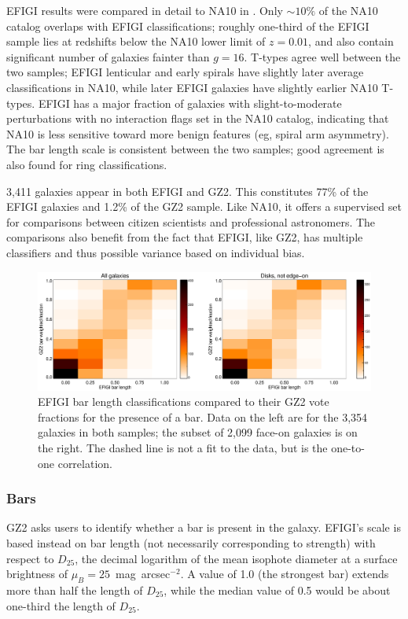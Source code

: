 \documentclass[useAMS,usenatbib]{mn2e}
\begin{document}
EFIGI results were compared in detail to NA10 in \citet{bai11}. Only $\sim10\%$ of the NA10 catalog overlaps with EFIGI classifications; roughly one-third of the EFIGI sample lies at redshifts below the NA10 lower limit of $z=0.01$, and also contain significant number of galaxies fainter than $g=16$. T-types agree well between the two samples; EFIGI lenticular and early spirals have slightly later average classifications in NA10, while later EFIGI galaxies have slightly earlier NA10 T-types. EFIGI has a major fraction of galaxies with slight-to-moderate perturbations with no interaction flags set in the NA10 catalog, indicating that NA10 is less sensitive toward more benign features (eg, spiral arm asymmetry). The bar length scale is consistent between the two samples; good agreement is also found for ring classifications. 

3,411 galaxies appear in both EFIGI and GZ2. This constitutes 77\% of the EFIGI galaxies and 1.2\% of the GZ2 sample. Like NA10, it offers a supervised set for comparisons between citizen scientists and professional astronomers. The comparisons also benefit from the fact that EFIGI, like GZ2, has multiple classifiers and thus possible variance based on individual bias. 

\begin{figure}
\includegraphics[angle=0,width=7.0in]{figures/efigi_bars.eps}
\caption{EFIGI bar length classifications compared to their GZ2 vote fractions for the presence of a bar. Data on the left are for the 3,354 galaxies in both samples; the subset of 2,099 face-on galaxies is on the right. The dashed line is not a fit to the data, but is the one-to-one correlation. 
\label{fig-efigi_bars}}
\end{figure}

\subsubsection{Bars}

GZ2 asks users to identify whether a bar is present in the galaxy. EFIGI's scale is based instead on bar length (not necessarily corresponding to strength) with respect to $D_{25}$, the decimal logarithm of the mean isophote diameter at a surface brightness of $\mu_B=25$~mag~arcsec$^{-2}$. A value of 1.0 (the strongest bar) extends more than half the length of $D_{25}$, while the median value of 0.5 would be about one-third the length of $D_{25}$. 
\end{document}
